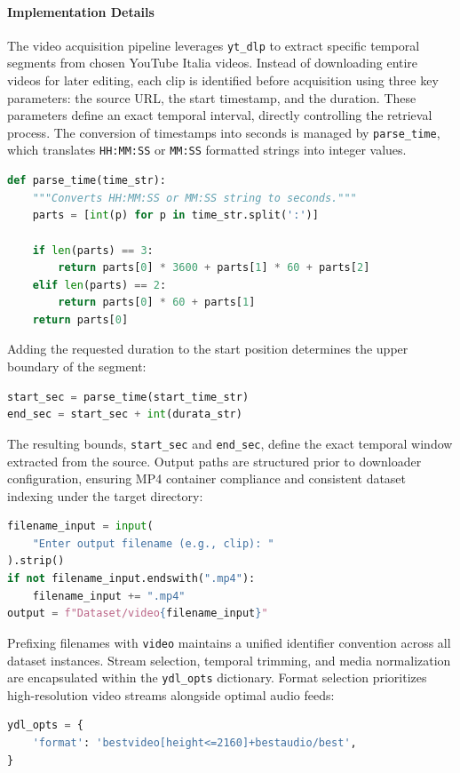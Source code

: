 \paragraph{Implementation Details}
The video acquisition pipeline leverages \texttt{yt\_dlp} to extract specific temporal segments from chosen YouTube Italia videos. Instead of downloading entire videos for later editing, each clip is identified before acquisition using three key parameters: the source URL, the start timestamp, and the duration. These parameters define an exact temporal interval, directly controlling the retrieval process. The conversion of timestamps into seconds is managed by \texttt{parse\_time}, which translates \texttt{HH:MM:SS} or \texttt{MM:SS} formatted strings into integer values.
\begin{lstlisting}[language=Python, xleftmargin=2em]
def parse_time(time_str):
    """Converts HH:MM:SS or MM:SS string to seconds."""
    parts = [int(p) for p in time_str.split(':')]
    
    if len(parts) == 3:
        return parts[0] * 3600 + parts[1] * 60 + parts[2]
    elif len(parts) == 2:
        return parts[0] * 60 + parts[1]
    return parts[0]
\end{lstlisting}
Adding the requested duration to the start position determines the upper boundary of the segment:
\begin{lstlisting}[language=Python, xleftmargin=2em]
start_sec = parse_time(start_time_str)
end_sec = start_sec + int(durata_str)
\end{lstlisting}
The resulting bounds, \texttt{start\_sec} and \texttt{end\_sec}, define the exact temporal window extracted from the source.
Output paths are structured prior to downloader configuration, ensuring MP4 container compliance and consistent dataset indexing under the target directory:
\begin{lstlisting}[language=Python, xleftmargin=2em]
filename_input = input(
    "Enter output filename (e.g., clip): "
).strip()
if not filename_input.endswith(".mp4"):
    filename_input += ".mp4"
output = f"Dataset/video{filename_input}"
\end{lstlisting}
Prefixing filenames with \texttt{video} maintains a unified identifier convention across all dataset instances.
Stream selection, temporal trimming, and media normalization are encapsulated within the \texttt{ydl\_opts} dictionary. Format selection prioritizes high-resolution video streams alongside optimal audio feeds:
\begin{lstlisting}[language=Python, xleftmargin=2em]
ydl_opts = {
    'format': 'bestvideo[height<=2160]+bestaudio/best',
}
\end{lstlisting}
